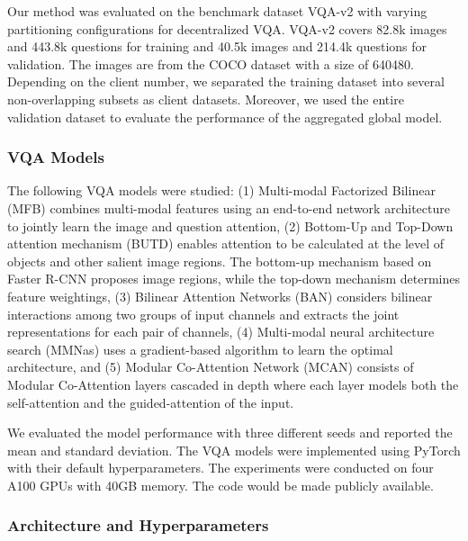 \documentclass[letterpaper]{article} %
\begin{document}
Our method was evaluated on the benchmark dataset VQA-v2 \cite{vqabase} with varying partitioning configurations for decentralized VQA.
VQA-v2 covers 82.8k images and 443.8k questions for training and 40.5k images and 214.4k questions for validation. The images are from the COCO dataset \cite{coco} with a size of 640480. Depending on the client number, we separated the training dataset into several non-overlapping subsets as client datasets. Moreover, we used the entire validation dataset to evaluate the performance of the aggregated global model.

\subsubsection{VQA Models} \label{sec:models} The following VQA models were studied: (1) Multi-modal Factorized Bilinear (MFB) \cite{mfb} combines multi-modal features using an end-to-end network architecture to jointly learn the image and question attention, (2) Bottom-Up and Top-Down attention mechanism (BUTD) \cite{butd} enables attention to be calculated at the level of objects and other salient image regions. The bottom-up mechanism based on Faster R-CNN proposes image regions, while the top-down mechanism determines feature weightings, (3) Bilinear Attention Networks (BAN) \cite{ban} considers bilinear interactions among two groups of input channels and extracts the joint representations for each pair of channels, (4) Multi-modal neural architecture search (MMNas) \cite{mmnas} uses a gradient-based algorithm to learn the optimal architecture, and (5) Modular Co-Attention Network (MCAN) \cite{mcan} consists of Modular Co-Attention layers cascaded in depth where each layer models both the self-attention and the guided-attention of the input.

We evaluated the model performance with three different seeds and reported the mean and standard deviation. The VQA models were implemented using PyTorch with their default hyperparameters. The experiments were conducted on four A100 GPUs with 40GB memory. The code would be made publicly available.


\subsubsection{Architecture and Hyperparameters}
\label{structure}
\end{document}
